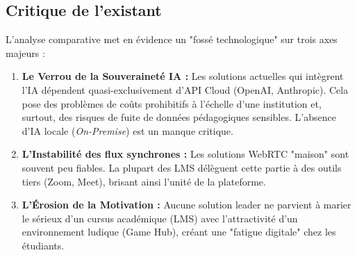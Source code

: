 \begin{table}[H]
\centering
{}
\caption{Analyse comparative des solutions face à EduGenius}
\end{table}

\subsection{Critique de l'existant}
L'analyse comparative met en évidence un "fossé technologique" sur trois axes majeurs :

\begin{enumerate}
\item \textbf{Le Verrou de la Souveraineté IA :} Les solutions actuelles qui intègrent l'IA dépendent quasi-exclusivement d'API Cloud (OpenAI, Anthropic). Cela pose des problèmes de coûts prohibitifs à l'échelle d'une institution et, surtout, des risques de fuite de données pédagogiques sensibles. L'absence d'IA locale (\textit{On-Premise}) est un manque critique.
\item \textbf{L'Instabilité des flux synchrones :} Les solutions WebRTC "maison" sont souvent peu fiables. La plupart des LMS délèguent cette partie à des outils tiers (Zoom, Meet), brisant ainsi l'unité de la plateforme.
\item \textbf{L'Érosion de la Motivation :} Aucune solution leader ne parvient à marier le sérieux d'un cursus académique (LMS) avec l'attractivité d'un environnement ludique (Game Hub), créant une "fatigue digitale" chez les étudiants.
\end{enumerate}

